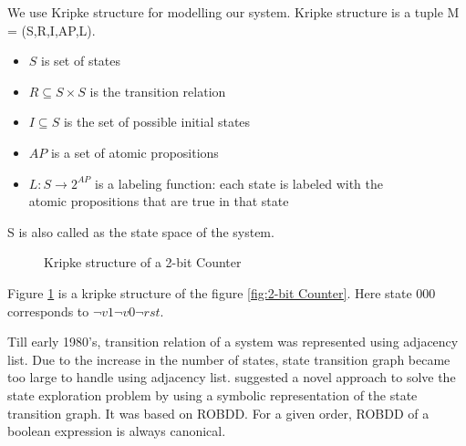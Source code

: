 We use Kripke structure for modelling our system. Kripke structure is a tuple M = (S,R,I,AP,L).
\begin{itemize}
\item $S$ is set of states
\item $R\subseteq S\times S$ is the transition relation
\item $I\subseteq S$ is the set of possible initial states
\item $AP$ is a set of atomic propositions
\item $L:S\rightarrow 2^{AP}$ is a labeling function: each state is labeled with the\\ atomic propositions that are true in that state
\end{itemize}
S is also called as the state space of the system.

\begin{figure}
\centering
{}
\caption{Kripke structure of a 2-bit Counter} 
\label{fig:kripke structure 2-bit counter}
\end{figure}

Figure \ref{fig:kripke structure 2-bit counter} is a kripke structure of the figure \ref{fig:2-bit Counter}. Here state 000 corresponds to $\neg v1 \neg v0 \neg rst$.

Till early 1980's, transition relation of a system was represented using adjacency list\cite{Clarke 2008}.  Due to the increase in the number of states, state transition graph became too large to handle using adjacency list. \cite{McMillian 1993} suggested a novel approach to solve the state exploration problem by using a symbolic representation of the state transition graph. It was based on ROBDD. For a given order, ROBDD of a boolean expression is always canonical\cite{Bryant 1986}.